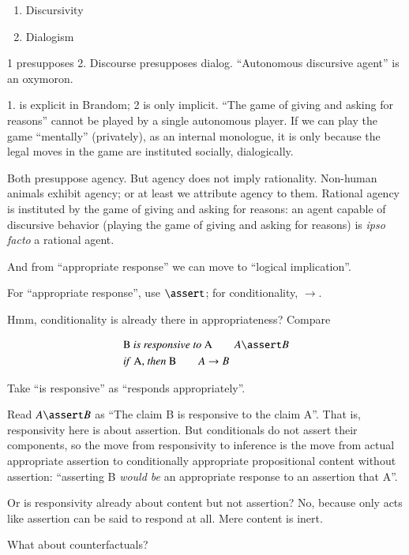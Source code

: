 \begin{enumerate}
\item Discursivity
\item Dialogism
\end{enumerate}

1 presupposes 2. Discourse presupposes dialog. ``Autonomous discursive
agent'' is an oxymoron.

1. is explicit in Brandom; 2 is only implicit. ``The game of giving
and asking for reasons'' cannot be played by a single autonomous
player. If we can play the game ``mentally'' (privately), as an
internal monologue, it is only because the legal moves in the game are
instituted socially, dialogically.

Both presuppose agency. But agency does not imply rationality.
Non-human animals exhibit agency; or at least we attribute agency to
them. Rational agency is instituted by the game of giving and asking
for reasons: an agent capable of discursive behavior (playing the game
of giving and asking for reasons) is \textit{ipso facto} a rational
agent.

And from ``appropriate response'' we can move to ``logical
implication''.

For ``appropriate response'', use \(\linfer\); for conditionality,
\(\rightarrow\).

Hmm, conditionality is already there in appropriateness? Compare

\begin{align}
 & \text{B \textit{is responsive to} A}\hskip2em A\linfer B \\
 & \text{\textit{if} A, \textit{then} B}\hskip2em A\rightarrow B
\end{align}

Take ``is responsive'' as ``responds appropriately''.

Read \(A\linfer B\) as ``The claim B is responsive to the claim A''.
That is, responsivity here is about assertion. But conditionals do not
assert their components, so the move from responsivity to inference is
the move from actual appropriate assertion to conditionally
appropriate propositional content without assertion: ``asserting B
\textit{would be} an appropriate response to an assertion that A''.

Or is responsivity already about content but not assertion? No,
because only acts like assertion can be said to respond at all. Mere
content is inert.

What about counterfactuals?

